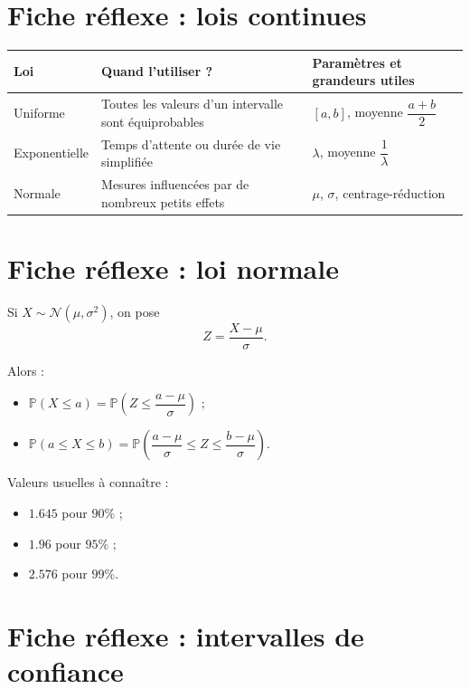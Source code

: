 \section{Fiche réflexe : lois continues}

\begin{center}
\renewcommand{\arraystretch}{1.5}
\begin{tabular}{|m{3cm}|m{4.5cm}|m{4.8cm}|}
\hline
\textbf{Loi} & \textbf{Quand l'utiliser ?} & \textbf{Paramètres et grandeurs utiles} \\
\hline
Uniforme & Toutes les valeurs d'un intervalle sont équiprobables & $[a,b]$, moyenne $\dfrac{a+b}{2}$ \\
\hline
Exponentielle & Temps d'attente ou durée de vie simplifiée & $\lambda$, moyenne $\dfrac{1}{\lambda}$ \\
\hline
Normale & Mesures influencées par de nombreux petits effets & $\mu$, $\sigma$, centrage-réduction \\
\hline
\end{tabular}
\end{center}

\section{Fiche réflexe : loi normale}

Si $X\sim \mathcal{N}(\mu,\sigma^2)$, on pose
$$
Z=\frac{X-\mu}{\sigma}.
$$

Alors :
\begin{itemize}
    \item $\mathbb{P}(X\leq a)=\mathbb{P}\left(Z\leq \dfrac{a-\mu}{\sigma}\right)$ ;
    \item $\mathbb{P}(a\leq X\leq b)=\mathbb{P}\left(\dfrac{a-\mu}{\sigma}\leq Z \leq \dfrac{b-\mu}{\sigma}\right)$.
\end{itemize}

Valeurs usuelles à connaître :
\begin{itemize}
    \item $1.645$ pour $90\%$ ;
    \item $1.96$ pour $95\%$ ;
    \item $2.576$ pour $99\%$.
\end{itemize}

\section{Fiche réflexe : intervalles de confiance}

